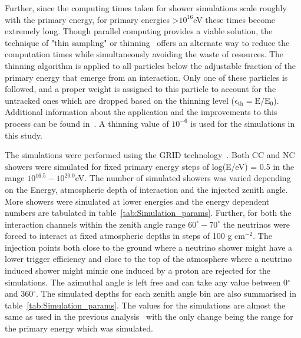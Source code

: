 Further, since the computing times taken for shower simulations scale roughly with the primary energy, for primary energies >$10^{16}$eV these times become extremely long. Though parallel computing provides a viable solution, the technique of "thin sampling" or thinning~\cite{Hillas:1997tf} offers an alternate way to reduce the computation times while simultaneously avoiding the waste of resources. The thinning algorithm is applied to all particles below the adjustable fraction of the primary energy that emerge from an interaction. Only one of these particles is followed, and a proper weight is assigned to this particle to account for the untracked ones which are dropped based on the thinning level ($\mathrm{\epsilon_{th} = E/E_0}$). Additional information about the application and the improvements to this process can be found in~\cite{Heck:1998gr,Kobal:2001jx}. A thinning value of $10^{-6}$ is used for the simulations in this study.


The simulations were performed using the GRID technology~\cite{GRID_tech,LozanoBahilo:2012pe}. Both CC and NC showers were simulated for fixed primary energy steps of log(E/eV) = 0.5 in the range $10^{16.5}-10^{20.0}$eV. The number of simulated showers was varied depending on the Energy, atmospheric depth of interaction and the injected zenith angle. More showers were simulated at lower energies and the energy dependent numbers are tabulated in table~\ref{tab:Simulation_params}. Further, for both the interaction channels within the zenith angle range $60^{\circ}-70^{\circ}$ the neutrinos were forced to interact at fixed atmospheric depths in steps of 100 g cm$^{-2}$. The injection points both close to the ground where a neutrino shower might have a lower trigger efficiency and close to the top of the atmosphere where a neutrino induced shower might mimic one induced by a proton are rejected for the simulations. The azimuthal angle is left free and can take any value between 0$^{\circ}$ and 360$^{\circ}$. The simulated depths for each zenith angle bin are also summarised in table~\ref{tab:Simulation_params}. The values for the simulations are almost the same as used in the previous analysis~\cite{gap_note_2013} with the only change being the range for the primary energy which was simulated.

